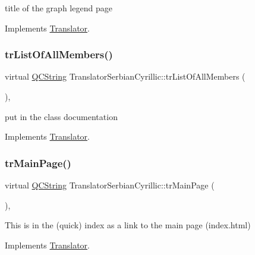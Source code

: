 title of the graph legend page 

Implements \mbox{\hyperlink{class_translator}{Translator}}.

\mbox{\label{class_translator_serbian_cyrillic_a3ba4d97ac221e7d170cff784d9bd4e6e}} 
\subsubsection{\texorpdfstring{trListOfAllMembers()}{trListOfAllMembers()}}
{\footnotesize\ttfamily virtual \mbox{\hyperlink{class_q_c_string}{Q\+C\+String}} Translator\+Serbian\+Cyrillic\+::tr\+List\+Of\+All\+Members (\begin{DoxyParamCaption}{ }\end{DoxyParamCaption})\hspace{0.3cm}{\ttfamily [inline]}, {\ttfamily [virtual]}}

put in the class documentation 

Implements \mbox{\hyperlink{class_translator}{Translator}}.

\mbox{\label{class_translator_serbian_cyrillic_a3575c3499807135ec439529feaaf319e}} 
\subsubsection{\texorpdfstring{trMainPage()}{trMainPage()}}
{\footnotesize\ttfamily virtual \mbox{\hyperlink{class_q_c_string}{Q\+C\+String}} Translator\+Serbian\+Cyrillic\+::tr\+Main\+Page (\begin{DoxyParamCaption}{ }\end{DoxyParamCaption})\hspace{0.3cm}{\ttfamily [inline]}, {\ttfamily [virtual]}}

This is in the (quick) index as a link to the main page (index.\+html) 

Implements \mbox{\hyperlink{class_translator}{Translator}}.

\mbox{\label{class_translator_serbian_cyrillic_a809c827e24ad426d7122f89355def798}} 
